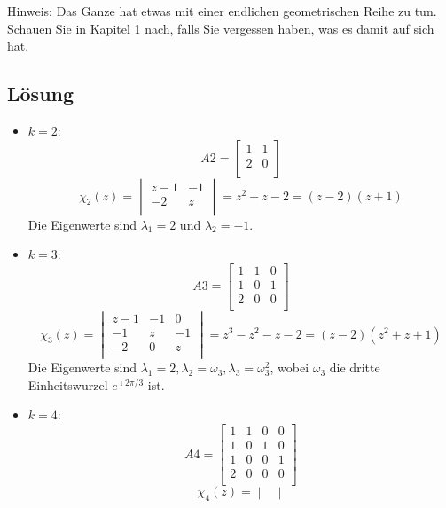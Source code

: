 Hinweis: Das Ganze hat etwas mit einer endlichen geometrischen Reihe zu tun.
Schauen Sie in Kapitel 1 nach, falls Sie vergessen haben, was es damit auf sich
hat.

\subsection*{Lösung}
\begin{flushenum}
\item
	\begin{itemize}
		\item $k= 2$: 
			\[ A2 = \begin{bmatrix}
					1 & 1 \\
					2 & 0 \\
				\end{bmatrix} \]
			\[ \chi_2(z) = 
				\begin{vmatrix}
					z - 1 & -1 \\
					-2    & z  \\
				\end{vmatrix} =
				z^2 - z - 2 = (z-2)(z+1) \]
			Die Eigenwerte sind $\lambda_1 = 2$ und $\lambda_2 = -1$.
		\item $k = 3$:
			\[ A3 = \begin{bmatrix}
					1 & 1 & 0 \\
					1 & 0 & 1 \\
					2 & 0 & 0 \\
				\end{bmatrix} \]
			\[ \chi_3(z) = 
				\begin{vmatrix}
					z-1 & -1 & 0 \\
					-1 & z & -1 \\
					-2 & 0 & z \\
				\end{vmatrix} =
				z^3 - z^2 - z - 2 = (z-2)(z^2 + z + 1) \]
			Die Eigenwerte sind $\lambda_1 = 2, \lambda_2 = \omega_3, \lambda_3 = \omega_3^2 $,
			wobei $\omega_3$ die dritte Einheitswurzel $e^{\imath 2 \pi / 3}$ ist.
		\item $k = 4$:
			\[ A4 =	\begin{bmatrix}
					1 & 1 & 0 & 0 \\
					1 & 0 & 1 & 0 \\
					1 & 0 & 0 & 1 \\
					2 & 0 & 0 & 0 \\
				\end{bmatrix} \]
			\[ \chi_4(z) = 
				\begin{vmatrix}

\end{vmatrix}\]
\end{itemize}
\end{flushenum}
